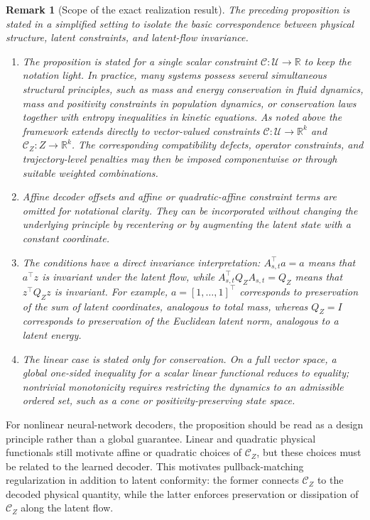 \documentclass[a4paper,fleqn]{cas-sc}
\theoremstyle{thmstyleone}%
\theoremstyle{thmstyletwo}%
\newtheorem{remark}{Remark}%
\theoremstyle{thmstylethree}%
\begin{document}
\begin{remark}[Scope of the exact realization result]
The preceding proposition is stated in a simplified setting to isolate the basic correspondence between physical structure, latent constraints, and latent-flow invariance.

\begin{enumerate}
    \item The proposition is stated for a single scalar constraint $\mathcal C:\mathcal U\to\mathbb R$ to keep the notation light. In practice, many systems possess several simultaneous structural principles, such as mass and energy conservation in fluid dynamics, mass and positivity constraints in population dynamics, or conservation laws together with entropy inequalities in kinetic equations. As noted above the framework extends directly to vector-valued constraints $\mathcal C:\mathcal U\to\mathbb R^k$ and $\mathcal C_Z:Z\to\mathbb R^k$. The corresponding compatibility defects, operator constraints, and trajectory-level penalties may then be imposed componentwise or through suitable weighted combinations.

    \item Affine decoder offsets and affine or quadratic-affine constraint terms are omitted for notational clarity. They can be incorporated without changing the underlying principle by recentering or by augmenting the latent state with a constant coordinate.

    \item The conditions have a direct invariance interpretation: $A_{s,t}^\top a=a$ means that $a^\top z$ is invariant under the latent flow, while $A_{s,t}^\top Q_ZA_{s,t}=Q_Z$ means that $z^\top Q_Zz$ is invariant. For example, $a=[1,\ldots,1]^\top$ corresponds to preservation of the sum of latent coordinates, analogous to total mass, whereas $Q_Z=I$ corresponds to preservation of the Euclidean latent norm, analogous to a latent energy.

    \item The linear case is stated only for conservation. On a full vector space, a global one-sided inequality for a scalar linear functional reduces to equality; nontrivial monotonicity requires restricting the dynamics to an admissible ordered set, such as a cone or positivity-preserving state space.
\end{enumerate}
\end{remark}

For nonlinear neural-network decoders, the proposition should be read as a design principle rather than a global guarantee. Linear and quadratic physical functionals still motivate affine or quadratic choices of $\mathcal C_Z$, but these choices must be related to the learned decoder. This motivates pullback-matching regularization in addition to latent conformity: the former connects $\mathcal C_Z$ to the decoded physical quantity, while the latter enforces preservation or dissipation of $\mathcal C_Z$ along the latent flow.
\end{document}
